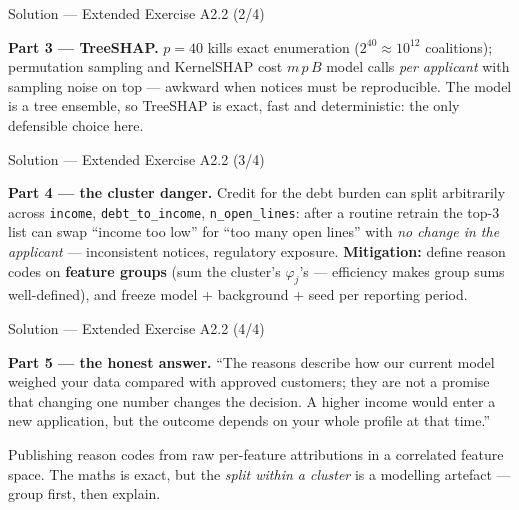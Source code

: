 \documentclass[aspectratio=169,11pt]{beamer}
\begin{document}
\begin{frame}{Solution --- Extended Exercise A2.2 (2/4)}
\begin{solutionbox}
  \smallskip
  \textbf{Part 3 --- TreeSHAP.} $p=40$ kills exact enumeration
  ($2^{40}\approx10^{12}$ coalitions); permutation sampling and KernelSHAP cost
  $m\,p\,B$ model calls \emph{per applicant} with sampling noise on top --- awkward
  when notices must be reproducible. The model is a tree ensemble, so TreeSHAP is
  exact, fast and deterministic: the only defensible choice here.
\end{solutionbox}
\end{frame}

\begin{frame}{Solution --- Extended Exercise A2.2 (3/4)}
\begin{solutionbox}
  \textbf{Part 4 --- the cluster danger.} Credit for the debt burden can split
  arbitrarily across \texttt{income}, \texttt{debt\_to\_income},
  \texttt{n\_open\_lines}: after a routine retrain the top-3 list can swap
  ``income too low'' for ``too many open lines'' with \emph{no change in the
  applicant} --- inconsistent notices, regulatory exposure. \textbf{Mitigation:}
  define reason codes on \textbf{feature groups} (sum the cluster's $\varphi_j$'s
  --- efficiency makes group sums well-defined), and freeze model + background +
  seed per reporting period.
\end{solutionbox}
\end{frame}

\begin{frame}{Solution --- Extended Exercise A2.2 (4/4)}
\begin{solutionbox}
  \smallskip
  \textbf{Part 5 --- the honest answer.} ``The reasons describe how our current
  model weighed your data compared with approved customers; they are not a promise
  that changing one number changes the decision. A higher income would enter a new
  application, but the outcome depends on your whole profile at that time.''
\end{solutionbox}
\begin{mistake}
  Publishing reason codes from raw per-feature attributions in a correlated feature
  space. The maths is exact, but the \emph{split within a cluster} is a modelling
  artefact --- group first, then explain.
\end{mistake}
\end{frame}
\end{document}
